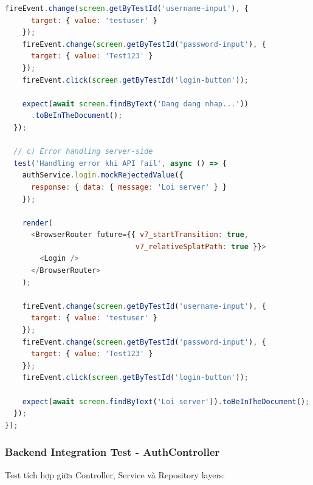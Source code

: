 \begin{lstlisting}[language=JavaScript, caption=Frontend Login Integration Test]
    fireEvent.change(screen.getByTestId('username-input'), {
      target: { value: 'testuser' }
    });
    fireEvent.change(screen.getByTestId('password-input'), {
      target: { value: 'Test123' }
    });
    fireEvent.click(screen.getByTestId('login-button'));

    expect(await screen.findByText('Dang dang nhap...'))
      .toBeInTheDocument();
  });

  // c) Error handling server-side
  test('Handling error khi API fail', async () => {
    authService.login.mockRejectedValue({
      response: { data: { message: 'Loi server' } }
    });

    render(
      <BrowserRouter future={{ v7_startTransition: true, 
                              v7_relativeSplatPath: true }}>
        <Login />
      </BrowserRouter>
    );

    fireEvent.change(screen.getByTestId('username-input'), {
      target: { value: 'testuser' }
    });
    fireEvent.change(screen.getByTestId('password-input'), {
      target: { value: 'Test123' }
    });
    fireEvent.click(screen.getByTestId('login-button'));

    expect(await screen.findByText('Loi server')).toBeInTheDocument();
  });
});
\end{lstlisting}

\subsubsection{Backend Integration Test - AuthController}
Test tích hợp giữa Controller, Service và Repository layers:

